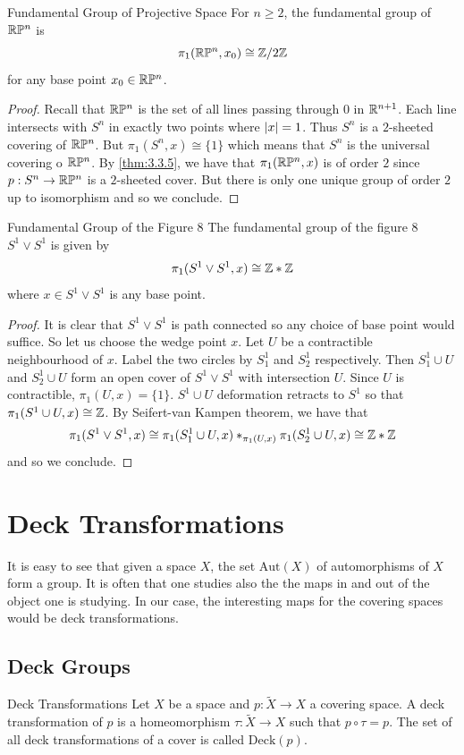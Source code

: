 \documentclass[a4paper]{article}
\begin{document}
\begin{thm}{Fundamental Group of Projective Space}{} For $n\geq 2$, the fundamental group of $\mathbb{R}\mathbb{P}^n$ is $$\pi_1(\mathbb{R}\mathbb{P}^n,x_0)\cong\mathbb{Z}/2\mathbb{Z}$$ for any base point $x_0\in\mathbb{R}\mathbb{P}^n$. \tcbline
\begin{proof}
Recall that $\mathbb{R}\mathbb{P}^n$ is the set of all lines passing through $0$ in $\mathbb{R}^{n+1}$. Each line intersects with $S^n$ in exactly two points where $\abs{x}=1$. Thus $S^n$ is a $2$-sheeted covering of $\mathbb{R}\mathbb{P}^n$. But $\pi_1(S^n,x)\cong\{1\}$ which means that $S^n$ is the universal covering o $\mathbb{R}\mathbb{P}^n$. By \ref{thm:3.3.5}, we have that $\pi_1(\mathbb{R}\mathbb{P}^n,x)$ is of order $2$ since $p:S^n\to\mathbb{R}\mathbb{P}^n$ is a $2$-sheeted cover. But there is only one unique group of order $2$ up to isomorphism and so we conclude. 
\end{proof}
\end{thm}

\begin{thm}{Fundamental Group of the Figure 8}{} The fundamental group of the figure 8 $S^1\vee S^1$ is given by $$\pi_1(S^1\vee S^1,x)\cong\mathbb{Z}\ast\mathbb{Z}$$ where $x\in S^1\vee S^1$ is any base point. \tcbline
\begin{proof}
It is clear that $S^1\vee S^1$ is path connected so any choice of base point would suffice. So let us choose the wedge point $x$. Let $U$ be a contractible neighbourhood of $x$. Label the two circles by $S_1^1$ and $S_2^1$ respectively. Then $S_1^1\cup U$ and $S_2^1\cup U$ form an open cover of $S^1\vee S^1$ with intersection $U$. Since $U$ is contractible, $\pi_1(U,x)=\{1\}$. $S^1\cup U$ deformation retracts to $S^1$ so that $\pi_1(S^1\cup U,x)\cong\mathbb{Z}$. By Seifert-van Kampen theorem, we have that $$\pi_1(S^1\vee S^1,x)\cong\pi_1(S_1^1\cup U,x)\ast_{\pi_1(U,x)}\pi_1(S_2^1\cup U,x)\cong\mathbb{Z}\ast\mathbb{Z}$$ and so we conclude. 
\end{proof}
\end{thm}


\pagebreak
\section{Deck Transformations}
It is easy to see that given a space $X$, the set $\text{Aut}(X)$ of automorphisms of $X$ form a group. It is often that one studies also the the maps in and out of the object one is studying. In our case, the interesting maps for the covering spaces would be deck transformations. 

\subsection{Deck Groups}
\begin{defn}{Deck Transformations}{} Let $X$ be a space and $p:\tilde{X}\to X$ a covering space. A deck transformation of $p$ is a homeomorphism $\tau:\tilde{X}\to X$ such that $p\circ\tau=p$. The set of all deck transformations of a cover is called $\text{Deck}(p)$. 
\end{defn}
\end{document}
